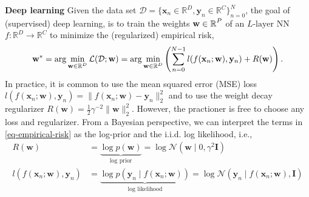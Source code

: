 \documentclass{article}
\newcommand{\dataset}{\ensuremath{\mathcal{D}}}
\newcommand{\inputDomain}{\ensuremath{\mathbb{R}^{D}}}
\newcommand{\outputDomain}{\ensuremath{\mathbb{R}^{C}}}
\newcommand{\transitionParams}{\ensuremath{\mathbf{w}}}
\begin{document}
\textbf{Deep learning}
Given the data set $\dataset = \{\mathbf{x}_{n} \in \inputDomain, \mathbf{y}_{n} \in \outputDomain\}_{n=0}^{N}$,
the goal of (supervised) deep learning, is to train the weights $\transitionParams \in \R^{P}$ of an $L\text{-layer}$ NN
$f : \inputDomain \rightarrow \outputDomain$ to minimize the (regularized) empirical risk,
\begin{align} \label{eq-empirical-risk}
  \transitionParams^{*} = \arg \min_{\transitionParams \in \R^{D}} \mathcal{L}(\dataset;\transitionParams) = \arg \min_{\transitionParams \in \R^{D}} \left(
  \sum_{n=0}^{N-1} l(f(\mathbf{x}_{n} ; \transitionParams), \mathbf{y}_{n}) + R(\transitionParams)  \right).
\end{align}
In practice, it is common to use the mean squared error (MSE) loss
$l(f(\mathbf{x}_{n} ; \transitionParams),\mathbf{y}_{n}) = \|f(\mathbf{x}_{n} ; \transitionParams) - \mathbf{y}_{n} \|^{2}_{2}$
and to use the weight decay regularizer $R(\transitionParams)=\frac{1}{2}\gamma^{-2}\|\transitionParams\|^{2}_{2}$.
However, the practioner is free to choose any loss and regularizer. 
From a Bayesian perspective, we can interpret the terms in \cref{eq-empirical-risk} as the log-prior and the i.i.d. log likelihood, i.e.,
\begin{align} \label{eq-log-prior}
  R(\transitionParams) &= \underbrace{\log p(\transitionParams)}_{\text{log prior}} = \log \mathcal{N}(\transitionParams \mid 0, \gamma^{2} \mathbf{I}) \\
  l(f(\mathbf{x}_{n} ; \transitionParams), \mathbf{y}_{n}) &= \underbrace{\log p(\mathbf{y}_{n} \mid f(\mathbf{x}_{n}; \transitionParams))}_{\text{log likelihood}}
  = \log \mathcal{N} \left( \mathbf{y}_{n} \mid f(\mathbf{x}_{n}; \transitionParams), \mathbf{I} \right) \label{eq-log-likelihood}
\end{align}
\end{document}
